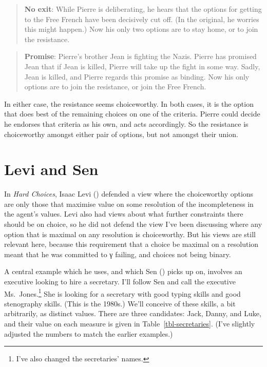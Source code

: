 \documentclass[
  11pt,
  letterpaper,
  DIV=11,
  numbers=noendperiod,
  twoside]{scrartcl}
\begin{document}
\begin{quote}
\textbf{No exit}: While Pierre is deliberating, he hears that the
options for getting to the Free French have been decisively cut off. (In
the original, he worries this might happen.) Now his only two options
are to stay home, or to join the resistance.
\end{quote}

\begin{quote}
\textbf{Promise}: Pierre's brother Jean is fighting the Nazis. Pierre
has promised Jean that if Jean is killed, Pierre will take up the fight
in some way. Sadly, Jean is killed, and Pierre regards this promise as
binding. Now his only options are to join the resistance, or join the
Free French.
\end{quote}

In either case, the resistance seems choiceworthy. In both cases, it is
the option that does best of the remaining choices on one of the
criteria. Pierre could decide he endorses that criteria as his own, and
acts accordingly. So the resistance is choiceworthy amongst either pair
of options, but not amongst their union.

\section{Levi and Sen}\label{sec-levisen}

In \emph{Hard Choices}, Isaac Levi ()
defended a view where the choiceworthy options are only those that
maximise value on some resolution of the incompleteness in the agent's
values. Levi also had views about what further constraints there should
be on choice, so he did not defend the view I've been discussing where
any option that is maximal on any resolution is choiceworthy. But his
views are still relevant here, because this requirement that a choice be
maximal on a resolution meant that he was committed to γ failing, and
choices not being binary.

A central example which he uses, and which Sen
() picks up on, involves an executive
looking to hire a secretary. I'll follow Sen and call the executive
Ms.~Jones.\footnote{I've also changed the secretaries' names.} She is
looking for a secretary with good typing skills and good stenography
skills. (This is the 1980s.) We'll conceive of these skills, a bit
arbitrarily, as distinct values. There are three candidates: Jack,
Danny, and Luke, and their value on each measure is given in
Table~\ref{tbl-secretaries}. (I've slightly adjusted the numbers to
match the earlier examples.)
\end{document}
